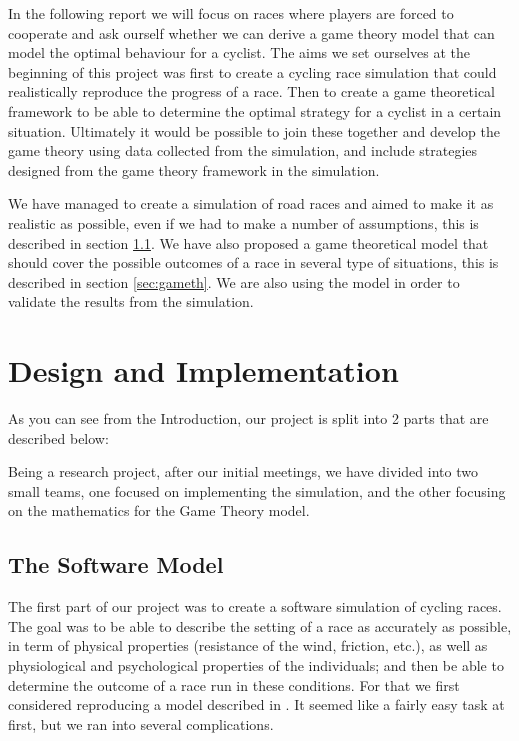 \documentclass[10pt, a4paper]{report}
\begin{document}
In the following report we will focus on races where players are forced to cooperate and ask ourself  whether we can derive a game theory model that can model the optimal behaviour for a cyclist. The aims we set ourselves at the beginning of this project was first to create a cycling race simulation that could realistically reproduce the progress of a race. Then to create a game theoretical framework to be able to determine the optimal strategy for a cyclist in a certain situation. Ultimately it would be possible to join these together and develop the game theory using data collected from the simulation, and include strategies designed from the game theory framework in the simulation.

We have managed to create a simulation of road races and aimed to make it as realistic as possible, even if we had to make a number of assumptions, this is described in section \ref{sec:softmodel}. We have also proposed a game theoretical model that should cover the possible outcomes of a race in several type of situations, this is described in section \ref{sec:gameth}. We are also using the model in order to validate the results from the simulation.

\chapter{Design and Implementation}\label{ch:design&impl}

As you can see from the Introduction, our project is split into 2 parts that are described below:

Being a research project, after our initial meetings, we have divided into two small teams, one focused on implementing the simulation, and the other focusing on the mathematics for the Game Theory model.


\section{The Software Model}\label{sec:softmodel}

The first part of our project was to create a software simulation of cycling races. The goal was to be able to describe the setting of a race as accurately as possible, in term of physical properties (resistance of the wind, friction, etc.), as well as physiological and psychological properties of the individuals; and then be able to determine the outcome of a race run in these conditions. For that we first considered reproducing a model described in \cite{AgentModel}. It seemed like a fairly easy task at first, but we ran into several complications.
\end{document}
